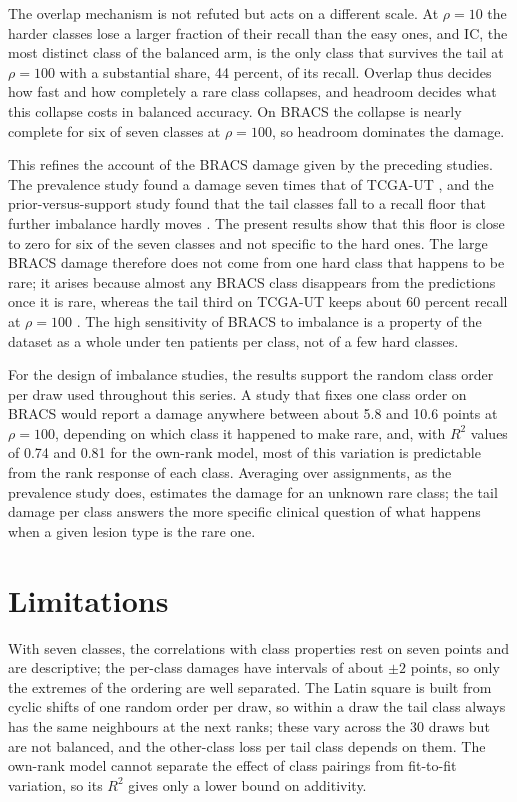 The overlap mechanism is not refuted but acts on a different scale. At $\rho=10$ the harder classes lose a larger fraction of their recall than the easy ones, and IC, the most distinct class of the balanced arm, is the only class that survives the tail at $\rho=100$ with a substantial share, 44 percent, of its recall. Overlap thus decides how fast and how completely a rare class collapses, and headroom decides what this collapse costs in balanced accuracy. On BRACS the collapse is nearly complete for six of seven classes at $\rho=100$, so headroom dominates the damage.

This refines the account of the BRACS damage given by the preceding studies. The prevalence study found a damage seven times that of TCGA-UT \citep{queisler2026prevalenceBracs}, and the prior-versus-support study found that the tail classes fall to a recall floor that further imbalance hardly moves \citep{queisler2026causeBracs}. The present results show that this floor is close to zero for six of the seven classes and not specific to the hard ones. The large BRACS damage therefore does not come from one hard class that happens to be rare; it arises because almost any BRACS class disappears from the predictions once it is rare, whereas the tail third on TCGA-UT keeps about 60 percent recall at $\rho=100$ \citep{queisler2026causeTcga}. The high sensitivity of BRACS to imbalance is a property of the dataset as a whole under ten patients per class, not of a few hard classes.

For the design of imbalance studies, the results support the random class order per draw used throughout this series. A study that fixes one class order on BRACS would report a damage anywhere between about 5.8 and 10.6 points at $\rho=100$, depending on which class it happened to make rare, and, with $R^2$ values of 0.74 and 0.81 for the own-rank model, most of this variation is predictable from the rank response of each class. Averaging over assignments, as the prevalence study does, estimates the damage for an unknown rare class; the tail damage per class answers the more specific clinical question of what happens when a given lesion type is the rare one.

\section{Limitations}
\label{sec:limitations}
With seven classes, the correlations with class properties rest on seven points and are descriptive; the per-class damages have intervals of about $\pm 2$ points, so only the extremes of the ordering are well separated. The Latin square is built from cyclic shifts of one random order per draw, so within a draw the tail class always has the same neighbours at the next ranks; these vary across the 30 draws but are not balanced, and the other-class loss per tail class depends on them. The own-rank model cannot separate the effect of class pairings from fit-to-fit variation, so its $R^2$ gives only a lower bound on additivity.

